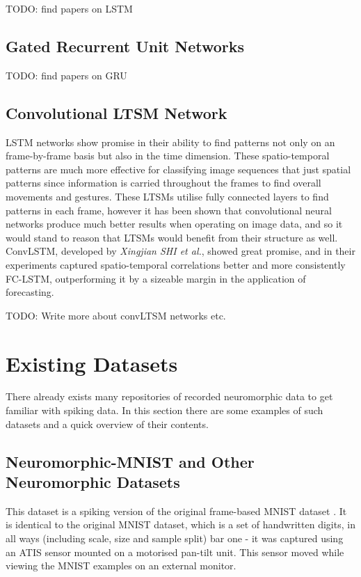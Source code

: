 \color{red} TODO: find papers on LSTM \color{black}

\subsection{Gated Recurrent Unit Networks}

\color{red} TODO: find papers on GRU \color{black}

\subsection{Convolutional LTSM Network}

LSTM networks show promise in their ability to find patterns not only on an frame-by-frame basis but also in the time dimension. These spatio-temporal patterns are much more effective for classifying image sequences that just spatial patterns since information is carried throughout the frames to find overall movements and gestures. These LTSMs utilise fully connected layers to find patterns in each frame, however it has been shown that convolutional neural networks produce much better results when operating on image data, and so it would stand to reason that LTSMs would benefit from their structure as well. ConvLSTM, developed by \textit{Xingjian SHI et al.}, showed great promise, and in their experiments captured spatio-temporal correlations better and more consistently FC-LSTM, outperforming it by a sizeable margin in the application of forecasting.

\color{red} TODO: Write more about convLTSM networks etc. \color{black}

\section{Existing Datasets} \label{sec:existing_datasets}

There already exists many repositories of recorded neuromorphic data to get familiar with spiking data. In this section there are some examples of such datasets and a quick overview of their contents.

\subsection{Neuromorphic-MNIST and Other Neuromorphic Datasets} \label{ssec:neuromorphic_datasets}

This dataset is a spiking version of the original frame-based MNIST dataset \cite{MNIST}\cite{NMNIST}. It is identical to the original MNIST dataset, which is a set of handwritten digits, in all ways (including scale, size and sample split) bar one - it was captured using an ATIS sensor mounted on a motorised pan-tilt unit. This sensor moved while viewing the MNIST examples on an external monitor.

